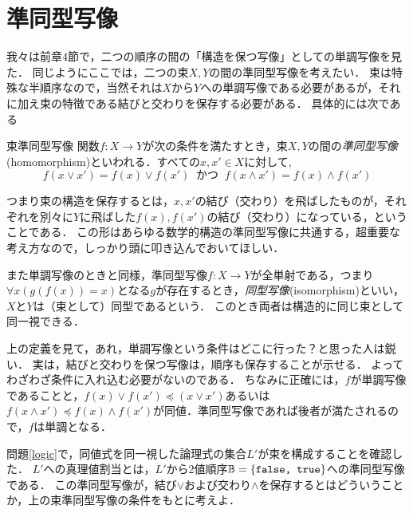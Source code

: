 \documentclass[11pt,a4paper]{jsarticle}
\begin{document}
\section{準同型写像}
我々は前章4節で，二つの順序の間の「構造を保つ写像」としての単調写像を見た．
同じようにここでは，二つの束$X, Y$の間の準同型写像を考えたい．
束は特殊な半順序なので，当然それは$X$から$Y$への単調写像である必要があるが，それに加え束の特徴である結びと交わりを保存する必要がある．
具体的には次である

\begin{itembox}[l]{束準同型写像}
関数$f:X \to Y$が次の条件を満たすとき，束$X, Y$の間の\emph{準同型写像}(homomorphism)といわれる．すべての$x, x' \in X$に対して, 
\[
 f(x \vee x') = f(x) \vee f(x') \ \text{ かつ } \ f(x \wedge x') = f(x) \wedge f(x')
\]
\end{itembox}
つまり束の構造を保存するとは，$x, x'$の結び（交わり）を飛ばしたものが，それぞれを別々に$Y$に飛ばした$f(x), f(x')$の結び（交わり）になっている，ということである．
この形はあらゆる数学的構造の準同型写像に共通する，超重要な考え方なので，しっかり頭に叩き込んでおいてほしい．

また単調写像のときと同様，準同型写像$f:X \to Y$が全単射である，つまり$\forall x (g(f(x))=x)$となる$g$が存在するとき，\emph{同型写像}(isomorphism)といい，$X$と$Y$は（束として）同型であるという．
このとき両者は構造的に同じ束として同一視できる．


\begin{attn}
上の定義を見て，あれ，単調写像という条件はどこに行った？と思った人は鋭い．
実は，結びと交わりを保つ写像は，順序も保存することが示せる．
よってわざわざ条件に入れ込む必要がないのである．
ちなみに正確には，$f$が単調写像であることと，$f(x) \vee f(x') \preceq (x \vee x')$あるいは$f(x \wedge x') \preceq f(x) \wedge f(x')$が同値．準同型写像であれば後者が満たされるので，$f$は単調となる．
\end{attn}

\begin{example}[真理値関数としての束準同型] \label{truthfunction}
問題\ref{logic}で，同値式を同一視した論理式の集合$L'$が束を構成することを確認した．
$L'$への真理値割当とは，$L'$から2値順序$\mathbb{B} = \{ \texttt{false, true} \}$への準同型写像である．
この準同型写像が，結び$\vee$および交わり$\wedge$を保存するとはどういうことか，上の束準同型写像の条件をもとに考えよ．
\end{example}
\end{document}
